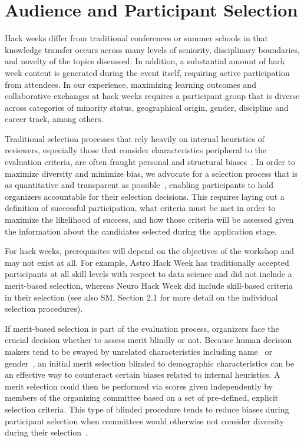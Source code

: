 \section*{Audience and Participant Selection}

Hack weeks differ from traditional conferences or summer schools in that knowledge transfer occurs across many levels of seniority, disciplinary boundaries, and novelty of the topics discussed.
In addition, a substantial amount of hack week content is generated during the event itself, requiring active participation from attendees.
In our experience, maximizing learning outcomes and collaborative exchanges at hack weeks requires a participant group that is diverse across categories of minority status, geographical origin, gender, discipline and career track, among others. 

Traditional selection processes that rely heavily on internal heuristics of reviewers, especially those that consider characteristics peripheral to the evaluation criteria, are often fraught personal and structural biases~\cite[e.g.][]{sunstein2015wiser}. 
In order to maximize diversity and minimize bias, we advocate for a selection process that is as quantitative and transparent as possible~\cite{sunstein2015wiser}, enabling participants to hold organizers accountable for their selection decisions.
This requires laying out a definition of successful participation, what criteria must be met in order to maximize the likelihood of success, and how those criteria will be assessed given the information about the candidates selected during the application stage.  

For hack weeks, prerequisites will depend on the objectives of the workshop and may not exist at all. For example, Astro Hack Week has traditionally accepted participants at all skill levels with respect to data science and did not include a merit-based selection, whereas Neuro Hack Week did include skill-based criteria in their selection (see also SM, Section 2.1 for more detail on the individual selection procedures). 

If merit-based selection is part of the evaluation process, organizers face the crucial decision whether to assess merit blindly or not. Because human decision makers tend to be swayed by unrelated characteristics including name~\cite{bertrand2004} or gender~\cite{mossracusin2012}, an initial merit selection blinded to demographic characteristics can be an effective way to counteract certain biases related to internal heuristics. A merit selection could then be performed via scores given independently by members of the organizing committee based on a set of pre-defined, explicit selection criteria. This type of blinded procedure tends to reduce biases during participant selection when committees would otherwise not consider diversity during their selection~\cite{bohnet2016}. 

